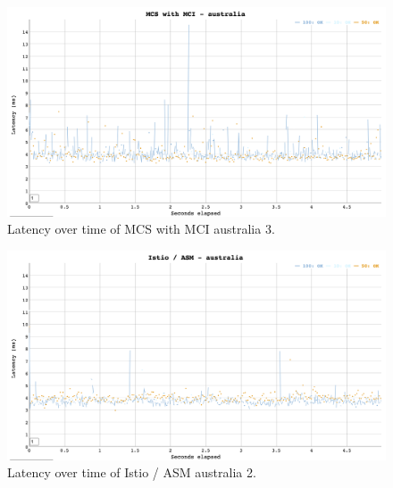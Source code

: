 

\begin{figure}
	\centering
	\includegraphics[width=1\textwidth]{assets/plots/mc-aus-2.png}
	\caption{Latency over time of MCS with MCI australia 3.}
	\label{fig:latency-plot-mc-aus-2}
\end{figure}

\begin{figure}
	\centering
	\includegraphics[width=1\textwidth]{assets/plots/asm-aus-2.png}
	\caption{Latency over time of Istio / ASM australia 2.}
	\label{fig:latency-plot-asm-aus-2}
\end{figure}

